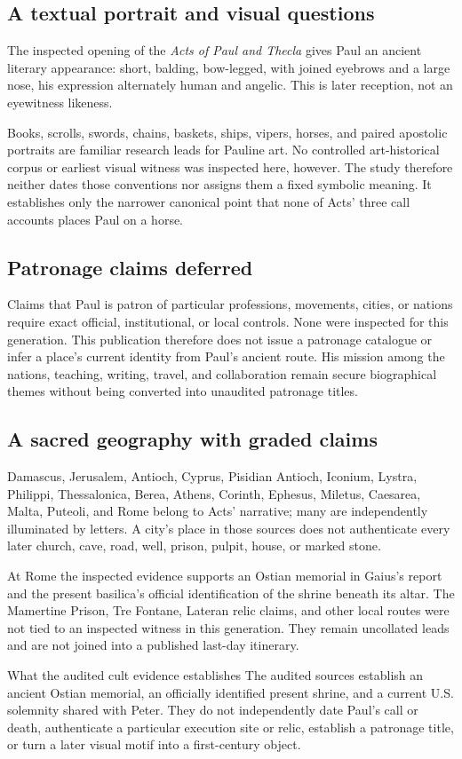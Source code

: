 \subsection{A textual portrait and visual questions}

The inspected opening of the \emph{Acts of Paul and Thecla} gives Paul an
ancient literary appearance: short, balding, bow-legged, with joined eyebrows
and a large nose, his expression alternately human and angelic. This is later
reception, not an eyewitness likeness.

Books, scrolls, swords, chains, baskets, ships, vipers, horses, and paired
apostolic portraits are familiar research leads for Pauline art. No controlled
art-historical corpus or earliest visual witness was inspected here, however.
The study therefore neither dates those conventions nor assigns them a fixed
symbolic meaning. It establishes only the narrower canonical point that none
of Acts' three call accounts places Paul on a horse.

\subsection{Patronage claims deferred}

Claims that Paul is patron of particular professions, movements, cities, or
nations require exact official, institutional, or local controls. None were
inspected for this generation. This publication therefore does not issue a
patronage catalogue or infer a place's current identity from Paul's ancient
route. His mission among the nations, teaching, writing, travel, and
collaboration remain secure biographical themes without being converted into
unaudited patronage titles.

\subsection{A sacred geography with graded claims}

Damascus, Jerusalem, Antioch, Cyprus, Pisidian Antioch, Iconium, Lystra,
Philippi, Thessalonica, Berea, Athens, Corinth, Ephesus, Miletus, Caesarea,
Malta, Puteoli, and Rome belong to Acts' narrative; many are independently
illuminated by letters. A city's place in those sources does not authenticate
every later church, cave, road, well, prison, pulpit, house, or marked stone.

At Rome the inspected evidence supports an Ostian memorial in Gaius's report
and the present basilica's official identification of the shrine beneath its
altar. The Mamertine Prison, Tre Fontane, Lateran relic claims, and other local
routes were not tied to an inspected witness in this generation. They remain
uncollated leads and are not joined into a published last-day itinerary.

\begin{studybox}{What the audited cult evidence establishes}
The audited sources establish an ancient Ostian memorial, an officially
identified present shrine, and a current U.S. solemnity shared with Peter.
They do not independently date Paul's call or death, authenticate a particular
execution site or relic, establish a patronage title, or turn a later visual
motif into a first-century object.
\end{studybox}
